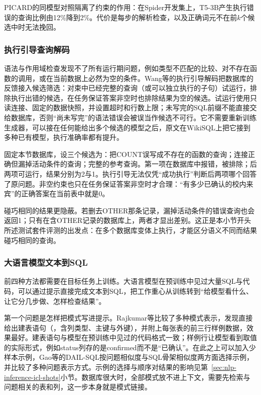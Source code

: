 PICARD的同模型对照隔离了约束的作用：在Spider开发集上，T5-3B产生执行错误的查询比例由12\%降到2\%。代价是每步的解析检查，以及正确词元不在前$k$个候选中时无法挽回。

\subsubsection{执行引导查询解码}
\label{sec:nlp-analysis-execution-guided}

语法与作用域检查发现不了所有运行期问题，例如类型不匹配的比较、对不存在函数的调用，或在当前数据上必然为空的条件。Wang等的执行引导解码把数据库的反馈接入候选筛选：对束中已经完整的查询（或可以独立执行的子句）试运行，排除执行出错的候选，在任务保证答案非空时也排除结果为空的候选。试运行使用只读连接、固定的数据快照，并设置超时和行数上限；未写完的SQL前缀不能直接交给数据库，否则“尚未写完”的语法错误会被误当作候选不可行。它不需要重新训练生成器，可以接在任何能给出多个候选的模型之后，原文在WikiSQL上把它接到多种已有模型，执行准确率都有提升。

固定本节数据库，设三个候选为：把COUNT误写成不存在的函数的查询；连接正确但漏掉活动条件的查询；完整的参考查询。第一项在数据库中报错，被排除；后两项可运行，结果分别为2与1。执行引导无法仅凭“成功执行”判断后两项哪个回答了原问题。非空约束也只在任务保证答案非空时才合理：“有多少已确认的校内来宾”的正确答案在当前表中就是0。

碰巧相同的结果更隐蔽。若删去OTHER那条记录，漏掉活动条件的错误查询也会返回1；只有在含OTHER记录的数据库上，两者才显出差别。这正是本小节开头所述测试套件评测的出发点：在多个数据库变体上执行，才能区分语义不同而结果碰巧相同的查询。

\subsubsection{大语言模型文本到SQL}
\label{sec:nlp-analysis-llm-text-to-sql}

前四种方法都需要在目标任务上训练。大语言模型在预训练中见过大量SQL与代码，可以通过提示直接完成文本到SQL，把工作重心从训练转到“给模型看什么、让它分几步做、怎样检查结果”。

第一个问题是怎样把模式写进提示。Rajkumar等比较了多种模式表示，发现直接给出建表语句（，含列类型、主键与外键），并附上每张表的前三行样例数据，效果最好。建表语句与模型在预训练中见过的代码格式一致；样例行让模型看到取值的实际形式，例如status列存的是confirmed而不是“已确认”。在此之上可以加入少样本示例，Gao等的DAIL-SQL按问题相似度与SQL骨架相似度两方面选择示例，并比较了多种问题表示方式。示例的选择与顺序对结果的影响见第~\ref{sec:nlp-inference-icl-shots}小节。数据库很大时，全部模式放不进上下文，需要先检索与问题相关的表和列，这一步本身就是模式链接。

